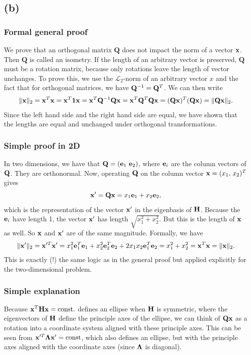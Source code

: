 \documentclass[11pt]{article}
\begin{document}
\subsection*{(b)}
\subsubsection*{Formal general proof}
We prove that an orthogonal matrix $\mathbf{Q}$ does not impact the norm of a vector $\mathbf{x}$. Then $\mathbf{Q}$ is called an isometry. If the length of an arbitrary vector is preserved, $\mathbf{Q}$ must be a rotation matrix, because only rotations leave the length of  vector unchanges. To prove this, we use the $\mathcal{L}_2$-norm of an arbitrary vector $x$ and the fact that for orthogonal matrices, we have $\mathbf{Q}^{-1} = \mathbf{Q}^T$. We can then write
\begin{equation}
\lVert\mathbf{x}\rVert_2 = \mathbf{x}^T\mathbf{x} = \mathbf{x}^T \mathbf{1} \mathbf{x} = \mathbf{x}^T\mathbf{Q}^{-1}\mathbf{Q}\mathbf{x} = \mathbf{x}^T\mathbf{Q}^T\mathbf{Q}\mathbf{x} = (\mathbf{Q}\mathbf{x})^T(\mathbf{Q}\mathbf{x}) = \lVert\mathbf{Q}\mathbf{x}\rVert_2.
\end{equation}
Since the left hand side and the right hand side are equal, we have shown that the lengths are equal and unchanged under orthogonal transformations.

\subsubsection*{Simple proof in 2D}
In two dimensions, we have that $\mathbf{Q} = (\mathbf{e}_1\,\, \mathbf{e}_2)$, where $\mathbf{e}_i$ are the column vectors of $\mathbf{Q}$. They are orthonormal. Now, operating $\mathbf{Q}$ on the column vector $\mathbf{x} = (x_1,\, x_2)^T$ gives
\begin{equation}
\mathbf{x}' = \mathbf{Q}\mathbf{x} = x_1\mathbf{e}_1 + x_2\mathbf{e}_2, 
\end{equation}
which is the representation of the vector $\mathbf{x}'$ in the eigenbasis of $\mathbf{H}$. Because the $\mathbf{e}_i$ have length 1, the vector $\mathbf{x}'$ has length $\sqrt{x_1^2 + x_2^2}$. But this is the length of $\mathbf{x}$ as well. So $\mathbf{x}$ and $\mathbf{x}'$ are of the same magnitude. Formally, we have
\begin{equation}
\lVert\mathbf{x}'\rVert_2 = \mathbf{x}'^T\mathbf{x}' = x_1^2\mathbf{e}_1^T\mathbf{e}_1 + x_2^2\mathbf{e}_2^T\mathbf{e}_2 + 2x_1x_2\mathbf{e}_1^T\mathbf{e}_2 = x_1^2 + x_2^2 = \mathbf{x}^T\mathbf{x} = \lVert\mathbf{x}\rVert_2.
\end{equation}
This is exactly (!) the same logic as in the general proof but applied explicitly for the two-dimensional problem.

\subsubsection*{Simple explanation}
Because $\mathbf{x}^T \mathbf{H} \mathbf{x} = \text{const}.$ defines an ellipse when $\mathbf{H}$ is symmetric, where the eigenvectors of $\mathbf{H}$ define the principle axes of the ellipse, we can think of $\mathbf{Q} \mathbf{x}$ as a rotation into a coordinate system aligned with these principle axes. This can be seen from $\mathbf{x}'^T \mathbf{\Lambda} \mathbf{x}' = \text{const}$, which also defines an ellipse, but with the principle axes aligned with the coordinate axes (since $\mathbf{\Lambda}$ is diagonal).
\end{document}
